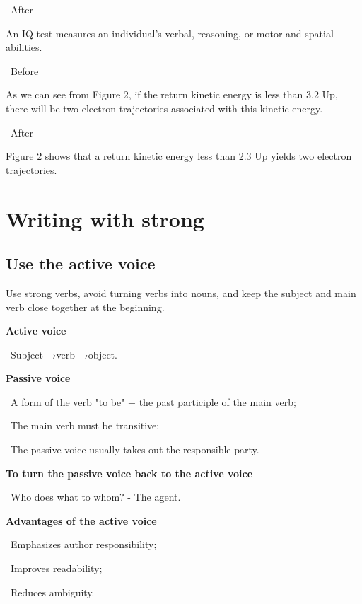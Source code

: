 \documentclass[a4paper, 12pt]{article}
\begin{document}
\par\textbullet\ After
\par An IQ test measures an individual's verbal, reasoning, or motor and spatial abilities.

\par\textbullet\ Before
\par As we can see from Figure 2, if the return kinetic energy is less than 3.2 Up, there will be two electron trajectories associated with this kinetic energy.

\par\textbullet\ After
\par Figure 2 shows that a return kinetic energy less than 2.3 Up yields two electron trajectories.

\newpage\section{Writing with strong}

\subsection{Use the active voice}

Use strong verbs, avoid turning verbs into nouns, and keep the subject and main verb close together at the beginning.

\par\textbf{Active voice}
\par\textbullet\ Subject \quad→\quad verb \quad→\quad object.

\par\textbf{Passive voice}
\par\textbullet\ A form of the verb "to be" + the past participle of the main verb;
\par\textbullet\ The main verb must be transitive;
\par\textbullet\ The passive voice usually takes out the responsible party.

\par\textbf{To turn the passive voice back to the active voice}
\par\textbullet\ Who does what to whom? - The agent.

\par\textbf{Advantages of the active voice}
\par\textbullet\ Emphasizes author responsibility;
\par\textbullet\ Improves readability;
\par\textbullet\ Reduces ambiguity.
\end{document}
